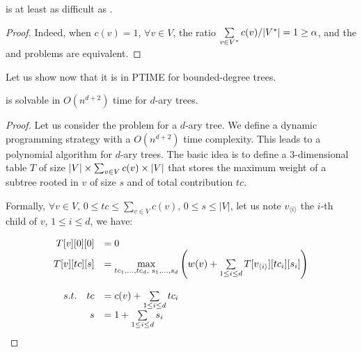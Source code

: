 		\begin{proposition}
			\rbmwcs{} is at least as difficult as \mwcs{}.
		\end{proposition}
		\begin{proof}
			Indeed, when $c(v) = 1,\,\forall v\in V$, the ratio $\sum\limits_{v \in V^*}{c(v)} / \lvert V^*\rvert = 1 \geq \alpha$, and the \mwcs{} and \rbmwcs{} problems are equivalent.
		\end{proof}

		Let us show now that it is in PTIME for bounded-degree trees.
		\begin{proposition}
			\rbmwcs{} is solvable in $O(n^{d+2})$ time for $d$-ary trees.
			\label{prop:boundedDegreeTreesRBMWCS}
		\end{proposition}
		\begin{proof}
			Let us consider the \rbmwcs{} problem for a $d$-ary tree.
			We define a dynamic programming strategy with a $O(n^{d+2})$ time complexity.
			This leads to a polynomial algorithm for $d$-ary trees.
			The basic idea is to define a 3-dimensional table $T$ of size $\lvert V\rvert\times \sum_{v\in V}c(v) \times \lvert V\rvert$ that stores the maximum weight of a subtree rooted in $v$ of size $s$ and of total contribution $tc$.

			Formally, $\forall v\in V,\,0 \leq tc \leq \sum_{v\in V}c(v),\,0 \leq s \leq |V|$, let us note $v_{\langle i\rangle}$ the $i$-th child of $v$, $1 \leq i \leq d$, we have:

			\[
			  \begin{array}{rl}
					T[v][0][0]   &= 0 \\
				  T[v][tc][s]  &= \max\limits_{tc_1,\ldots,tc_d,\,\,s_1,\ldots, s_d}\left(w(v) +
											 \sum\limits_{1 \leq i \leq d}{T[v_{\langle i\rangle}][tc_i][s_i]}
										\right) \\
									& \vphantom{foo} \\
				  s.t.\quad tc &= c(v) + \sum\limits_{1 \leq i \leq d}{tc_i} \\
								s  &= 1    + \sum\limits_{1 \leq i \leq d}{s_i}
				\end{array}
			\]


\end{proof}
